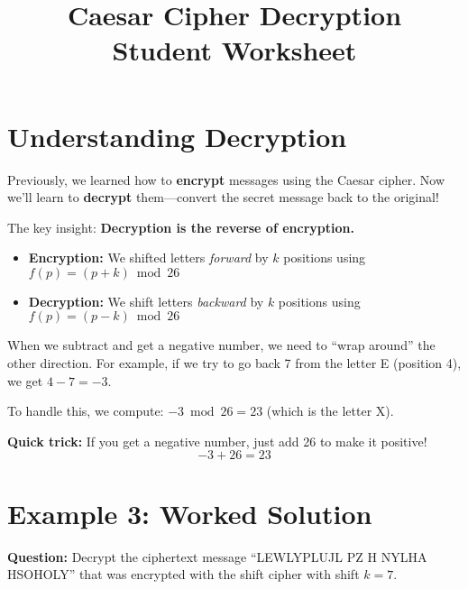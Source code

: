 \documentclass[12pt]{article}
\title{\textbf{Caesar Cipher Decryption} \\ Student Worksheet}
\date{}
\begin{document}
\maketitle

\section*{Understanding Decryption}

Previously, we learned how to \textbf{encrypt} messages using the Caesar cipher. Now we'll learn to \textbf{decrypt} them—convert the secret message back to the original!

The key insight: \textbf{Decryption is the reverse of encryption.}

\begin{itemize}[leftmargin=*]
\item \textbf{Encryption:} We shifted letters \emph{forward} by $k$ positions using $f(p) = (p + k) \bmod 26$
\item \textbf{Decryption:} We shift letters \emph{backward} by $k$ positions using $f(p) = (p - k) \bmod 26$
\end{itemize}

\vspace{0.3cm}

\begin{tcolorbox}[colback=blue!5!white,colframe=blue!50!black,title=\textbf{Key Concept: Negative Numbers and Mod}]
When we subtract and get a negative number, we need to ``wrap around'' the other direction. For example, if we try to go back 7 from the letter E (position 4), we get $4 - 7 = -3$. 

To handle this, we compute: $-3 \bmod 26 = 23$ (which is the letter X).

\textbf{Quick trick:} If you get a negative number, just add 26 to make it positive!
$$-3 + 26 = 23$$
\end{tcolorbox}

\vspace{0.5cm}

\section*{Example 3: Worked Solution}

\textbf{Question:} Decrypt the ciphertext message ``LEWLYPLUJL PZ H NYLHA HSOHOLY'' that was encrypted with the shift cipher with shift $k = 7$.

\vspace{0.3cm}
\end{document}
